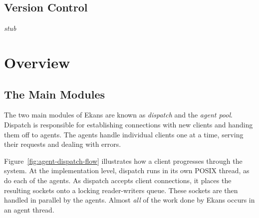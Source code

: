 \documentclass[11pt]{article}
\begin{document}
\subsection{Version Control}
\emph{stub}

\pagebreak

\section{Overview}

\subsection{The Main Modules}
The two main modules of Ekans are known as \emph{dispatch} and the \emph{agent pool}. Dispatch is responsible for establishing connections with new clients and handing them off to agents. The agents handle individual clients one at a time, serving their requests and dealing with errors.

Figure~\ref{fig:agent-dispatch-flow} illustrates how a client progresses through the system. At the implementation level, dispatch runs in its own POSIX thread, as do each of the agents. As dispatch accepts client connections, it places the resulting sockets onto a locking reader-writers queue. These sockets are then handled in parallel by the agents. Almost \emph{all} of the work done by Ekans occurs in an agent thread.
\end{document}
